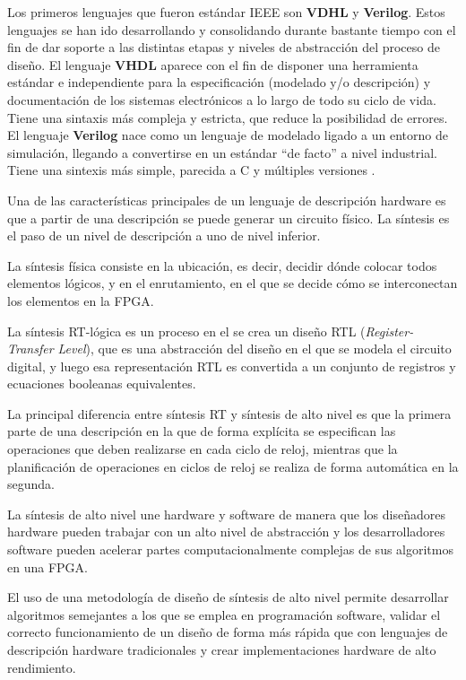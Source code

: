 Los primeros lenguajes que fueron estándar IEEE son \textbf{VDHL} y \textbf{Verilog}. Estos lenguajes se han ido desarrollando y consolidando durante bastante tiempo con el 
fin de dar soporte a las distintas etapas y niveles de abstracción del proceso de diseño. El lenguaje \textbf{VHDL} aparece con el fin de disponer una herramienta 
estándar e independiente para la especificación (modelado y/o descripción) y documentación de los sistemas electrónicos a lo largo de todo su ciclo de vida. 
Tiene una sintaxis más compleja y estricta, que reduce la posibilidad de errores. 
El lenguaje \textbf{Verilog} nace como un lenguaje de modelado ligado a un entorno de simulación, llegando a convertirse en un estándar ``de facto'' a nivel
industrial. Tiene una sintexis más simple, parecida a C y múltiples versiones \cite{teres1997vhdl}.

Una de las características principales de un lenguaje de descripción hardware es que a partir de una descripción se puede generar un 
circuito físico. La síntesis es el paso de un nivel de descripción a uno de nivel inferior.

La síntesis física consiste en la ubicación, es decir, decidir dónde colocar todos elementos lógicos, y en el enrutamiento, en el que se 
decide cómo se interconectan los elementos en la FPGA.

La síntesis RT-lógica es un proceso en el se crea un diseño RTL (\textit{Register-Transfer Level}), que es una abstracción del diseño 
en el que se modela el circuito digital, y luego esa representación RTL es convertida a un conjunto de registros y ecuaciones 
booleanas equivalentes. 

La principal diferencia entre síntesis RT y síntesis de alto nivel es que la primera parte de una descripción en la que de forma 
explícita se especifican las operaciones que deben realizarse en cada ciclo de reloj, mientras que la planificación de operaciones 
en ciclos de reloj se realiza de forma automática en la segunda.

La síntesis de alto nivel une hardware y software de manera que los diseñadores hardware pueden trabajar con un alto nivel de abstracción 
y los desarrolladores software pueden acelerar partes computacionalmente complejas de sus algoritmos en una FPGA. 

El uso de una metodología de diseño de síntesis de alto nivel permite desarrollar algoritmos semejantes a los que se emplea en 
programación software, validar el correcto funcionamiento de un diseño de forma más rápida que con lenguajes de descripción 
hardware tradicionales y crear implementaciones hardware de alto rendimiento.

